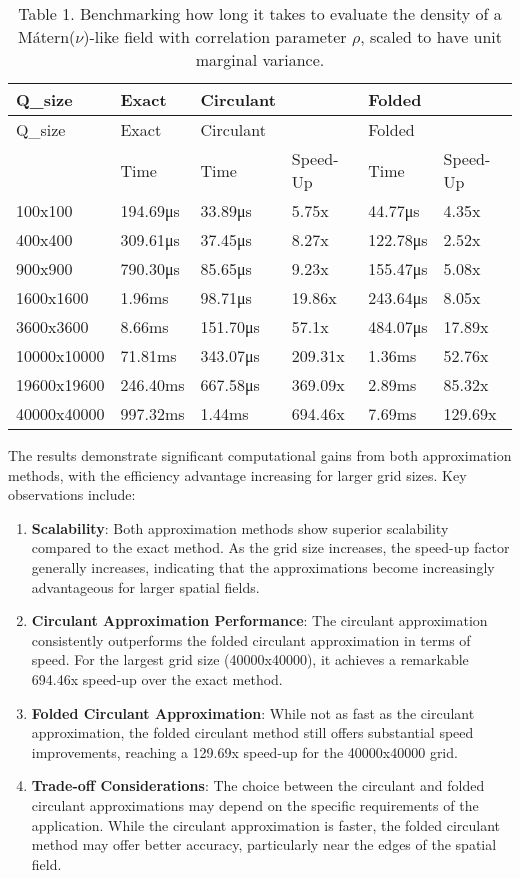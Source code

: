 \documentclass[journal=,manuscript=]{achemso}
\begin{document}
\begin{longtable}[]{@{}llllll@{}}
\caption{Table 1. Benchmarking how long it takes to evaluate the density
of a Mátern(\(\nu\))-like field with correlation parameter \(\rho\),
scaled to have unit marginal variance.}\tabularnewline
\toprule\noalign{}
Q\_size & Exact & Circulant & & Folded & \\
\midrule\noalign{}
\endfirsthead
\toprule\noalign{}
Q\_size & Exact & Circulant & & Folded & \\
\midrule\noalign{}
\endhead
\bottomrule\noalign{}
\endlastfoot
& Time & Time & Speed-Up & Time & Speed-Up \\
100x100 & 194.69μs & 33.89μs & 5.75x & 44.77μs & 4.35x \\
400x400 & 309.61μs & 37.45μs & 8.27x & 122.78μs & 2.52x \\
900x900 & 790.30μs & 85.65μs & 9.23x & 155.47μs & 5.08x \\
1600x1600 & 1.96ms & 98.71μs & 19.86x & 243.64μs & 8.05x \\
3600x3600 & 8.66ms & 151.70μs & 57.1x & 484.07μs & 17.89x \\
10000x10000 & 71.81ms & 343.07μs & 209.31x & 1.36ms & 52.76x \\
19600x19600 & 246.40ms & 667.58μs & 369.09x & 2.89ms & 85.32x \\
40000x40000 & 997.32ms & 1.44ms & 694.46x & 7.69ms & 129.69x \\
\end{longtable}

The results demonstrate significant computational gains from both
approximation methods, with the efficiency advantage increasing for
larger grid sizes. Key observations include:

\begin{enumerate}
\def\labelenumi{\arabic{enumi}.}
\item
  \textbf{Scalability}: Both approximation methods show superior
  scalability compared to the exact method. As the grid size increases,
  the speed-up factor generally increases, indicating that the
  approximations become increasingly advantageous for larger spatial
  fields.
\item
  \textbf{Circulant Approximation Performance}: The circulant
  approximation consistently outperforms the folded circulant
  approximation in terms of speed. For the largest grid size
  (40000x40000), it achieves a remarkable 694.46x speed-up over the
  exact method.
\item
  \textbf{Folded Circulant Approximation}: While not as fast as the
  circulant approximation, the folded circulant method still offers
  substantial speed improvements, reaching a 129.69x speed-up for the
  40000x40000 grid.
\item
  \textbf{Trade-off Considerations}: The choice between the circulant
  and folded circulant approximations may depend on the specific
  requirements of the application. While the circulant approximation is
  faster, the folded circulant method may offer better accuracy,
  particularly near the edges of the spatial field.
\end{enumerate}
\end{document}
